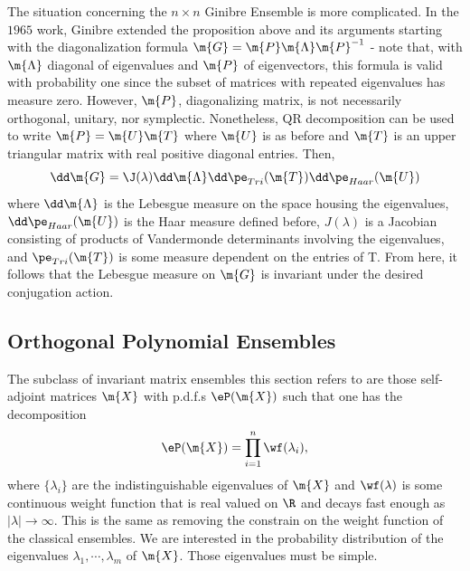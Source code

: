The situation concerning the $n \times n$ Ginibre Ensemble is more complicated. In the $1965$ work, Ginibre extended the proposition above and its arguments starting with the diagonalization formula $\m{G} = \m{P}\m{\Lambda}\m{P}^{-1}$ - note that, with $\m{\Lambda}$ diagonal of eigenvalues and $\m{P}$ of eigenvectors, this formula is valid with probability one since the subset of matrices with repeated eigenvalues has measure zero. However, $\m{P}$, diagonalizing matrix, is not necessarily orthogonal, unitary, nor symplectic. Nonetheless, QR decomposition can be used to write $\m{P} = \m{U}\m{T}$ where $\m{U}$ is as before and $\m{T}$ is an upper triangular matrix with real positive diagonal entries. Then,
\begin{equation}
	\dd \m{G} = \J(\lambda) \dd \m{\Lambda} \dd \pe_{Tri}(\m{T}) \dd \pe_{Haar}(\m{U})
\end{equation}
where $\dd \m{\Lambda}$ is the Lebesgue measure on the space housing the eigenvalues, $\dd \pe_{Haar}(\m{U})$ is the Haar measure defined before, $J(\lambda)$ is a Jacobian consisting of products of Vandermonde determinants involving the eigenvalues, and $\pe_{Tri}(\m{T})$ is some measure dependent on the entries of T. From here, it follows that the Lebesgue measure on $\m{G}$ is invariant under the desired conjugation action.

 \subsection{Orthogonal Polynomial Ensembles}
 \label{Subsection: Orthogonal Ensembles}
 
 The subclass of invariant matrix ensembles this section refers to are those self-adjoint matrices $\m{X}$ with p.d.f.s $\eP(\m{X})$ such that one has the decomposition
 \begin{equation}
 	\eP(\m{X}) = \prod_{i=1}^n \wf(\lambda_i),
 \end{equation}
 where $\{\lambda_i\}$ are the indistinguishable eigenvalues of $\m{X}$ and $\wf(\lambda)$ is some continuous weight function that is real valued on $\R$ and decays fast enough as $|\lambda| \rightarrow \infty$. This is the same as removing the constrain on the weight function of the classical ensembles. We are interested in the probability distribution of the eigenvalues $\lambda_1, \cdots, \lambda_m$ of $\m{X}$. Those eigenvalues must be simple.
 
